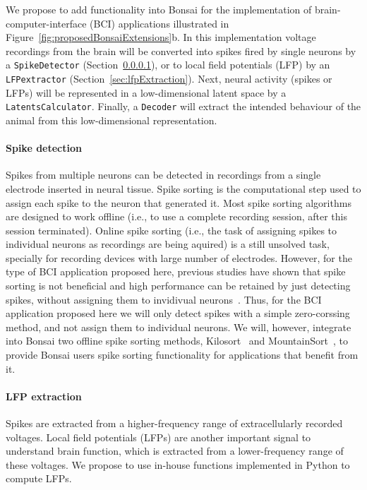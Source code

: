 We propose to add functionality into Bonsai for the implementation of
brain-computer-interface (BCI) applications illustrated in
Figure~\ref{fig:proposedBonsaiExtensions}b. In
this implementation voltage recordings from the brain will be converted into
spikes fired by single neurons by a \texttt{SpikeDetector}
(Section~\ref{sec:spikeDetection}), or to local field potentials (LFP) by an
\texttt{LFPextractor} (Section~\ref{sec:lfpExtraction}). Next, neural activity
(spikes or LFPs) will be represented in a low-dimensional latent space by a
\texttt{LatentsCalculator}. Finally, a \texttt{Decoder} will extract the
intended behaviour of the animal from this low-dimensional representation.

\paragraph{Spike detection}
\label{sec:spikeDetection}

Spikes from multiple neurons can be detected in recordings from a single
electrode inserted in neural tissue. Spike sorting is the computational step
used to assign each spike to the neuron that generated it. Most spike sorting
algorithms are designed to work offline (i.e., to use a complete recording
session, after this session terminated). Online spike sorting (i.e., the task
of assigning spikes to individual neurons as recordings are being aquired) is a
still unsolved task, specially for recording devices with large number of
electrodes.
%
However, for the type of BCI application proposed here, previous studies have
shown that spike sorting is not beneficial and high performance can be retained
by just detecting spikes, without assigning them to invidivual
neurons~\citep{trautmannEtAl19,todorovaEtAl14}. Thus, for the BCI application
proposed here we will only detect spikes with a simple zero-corssing method,
and not assign them to individual neurons.  We will, however, integrate into
Bonsai two offline spike sorting methods, Kilosort~\citep[][written in Matlab]{pachitariuEtAl16} and MountainSort~\citep[][written in
Python]{chungEtAl17}, to provide Bonsai users spike sorting functionality for
applications that benefit from it.

\paragraph{LFP extraction}
\label{sec:lfpExtractor}

Spikes are extracted from a higher-frequency range of extracellularly recorded
voltages. Local field potentials (LFPs) 
are another important signal to understand brain function, which is extracted
from a lower-frequency range of these voltages. We propose to use in-house
functions implemented in Python to compute LFPs.

